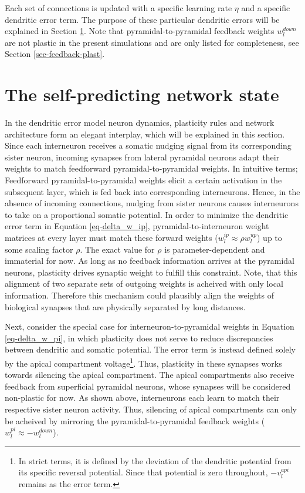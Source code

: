 Each set of connections is updated with a specific learning rate $\eta$ and a specific dendritic error term. The purpose
of these particular dendritic errors will be explained in Section \ref{sec-selfpred}. Note that pyramidal-to-pyramidal
feedback weights $w_l^{down}$ are not plastic in the present simulations and are only listed for completeness, see
Section \ref{sec-feedback-plast}.

\section{The self-predicting network state}\label{sec-selfpred}

In the dendritic error model neuron dynamics, plasticity rules and network architecture form an elegant interplay, which
will be explained in this section. Since each interneuron receives a somatic nudging signal from its corresponding
sister neuron, incoming synapses from lateral pyramidal neurons adapt their weights to match feedforward
pyramidal-to-pyramidal weights. In intuitive terms; Feedforward pyramidal-to-pyramidal weights elicit a certain
activation in the subsequent layer, which is fed back into corresponding interneurons. Hence, in the absence of incoming
connections, nudging from sister neurons causes interneurons to take on a proportional somatic potential. In order to
minimize the dendritic error term in Equation \ref{eq-delta_w_ip}, pyramidal-to-interneuron weight matrices at every
layer must match these forward weights ($w_l^{ip} \approx \rho w_l^{up}$) up to some scaling factor $\rho$. The exact
value for $\rho$ is parameter-dependent and immaterial for now. As long as no feedback information arrives at the
pyramidal neurons, plasticity drives synaptic weight to fulfill this constraint. Note, that this alignment of two
separate sets of outgoing weights is acheived with only local information. Therefore this mechanism could plausibly
align the weights of biological synapses that are physically separated by long distances. \newline

Next, consider the special case for interneuron-to-pyramidal weights in Equation \ref{eq-delta_w_pi}, in which
plasticity does not serve to reduce discrepancies between dendritic and somatic potential. The error term is instead
defined solely by the apical compartment voltage\footnote{In strict terms, it is defined by the deviation of the
dendritic potential from its specific reversal potential. Since that potential is zero throughout, $- v_l^{api}$ remains
as the error term.}. Thus, plasticity in these synapses works towards silencing the apical compartment. The apical
compartments also receive feedback from superficial pyramidal neurons, whose synapses will be considered non-plastic for
now. As shown above, interneurons each learn to match their respective sister neuron activity. Thus, silencing of apical
compartments can only be acheived by mirroring the pyramidal-to-pyramidal feedback weights ($w_l^{pi} \approx
-w_l^{down}$).\newline

